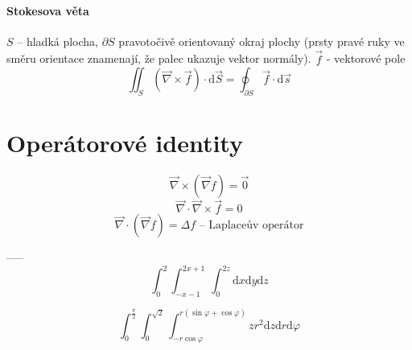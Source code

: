 \documentclass[a4paper, twoside,%
12pt]{article}
\newcommand{\dif}{\mathrm{d}}
\begin{document}
\paragraph{Stokesova věta} $S$ -- hladká plocha, $\partial S$ pravotočivě orientovaný okraj plochy (prsty pravé ruky ve směru orientace znamenají, že palec ukazuje vektor normály). $\vec f$ - vektorové pole
$$\iint_S (\vec{\nabla}\times \vec{f}) \cdot \dif\vec S = \oint_{\partial S} \vec{f}\cdot \dif \vec{s} $$

\section*{Operátorové identity}

$$  \vec{\nabla}\times( \vec\nabla {f}) = \vec 0 $$
$$ \vec\nabla \cdot \vec{\nabla}\times \vec{f} = 0 $$
$$  \vec{\nabla}\cdot( \vec\nabla {f}) = \Delta f \text{ -- Laplaceův operátor} $$

-----
$$ \int_0^{2} \int_{-x-1}^{2x+1}\int_{0}^{2z} \dif x \dif y \dif z $$

$$\int_{0}^{\frac{\pi}{2}} \int_{0}^{\sqrt{2}} \int_{-r\cos\varphi}^{r(\sin\varphi+\cos\varphi)} zr^2 \dif z \dif r\dif \varphi $$
\end{document}
